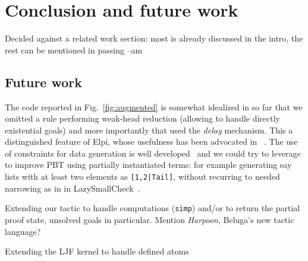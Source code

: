 \section{Conclusion and future work}


\begin{metanote}
  Decided against a related work section: most is already discussed in the intro, the rest can be mentioned in passing --am
\end{metanote}


\subsection{Future work}
\label{ssec:fut}

The code reported in Fig.~\ref{fig:augmented} is somewhat idealized in
so far that we omitted a rule performing weak-head reduction (allowing
to handle directly existential goals) and more importantly that used
the \emph{delay} mechanism. This a distinguished feature of Elpi, whose
usefulness has been advocated in ~\cite{DunchevCT16,coen19mscs}.  The
use of constraints for data generation is well
developed~\cite{FioravantiPS15} and we could try to leverage to
improve PBT using partially instantiated terms: for example generating
say lists with at least two elements as \texttt{[1,2|Tail]}, without
recurring to needed narrowing as in in
LazySmallCheck~\cite{smallcheck}.


Extending our tactic to handle computations (\texttt{simp}) and/or to
return the partial proof state, unsolved goals in particular. Mention
\emph{Harpoon}, Beluga's new tactic language?

Extending the LJF kernel to handle defined atoms

